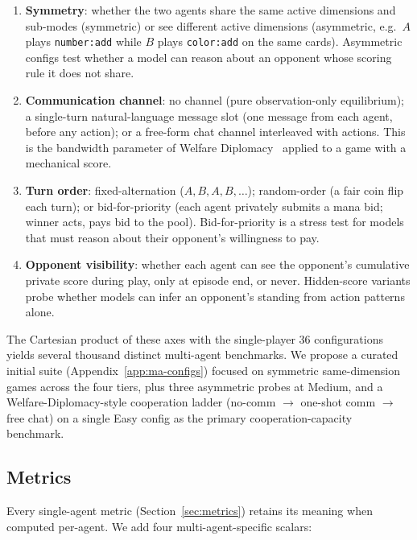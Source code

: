 \documentclass[11pt]{article}
\begin{document}
\begin{enumerate}
  \item \textbf{Symmetry}: whether the two agents share the same active
    dimensions and sub-modes (symmetric) or see different active
    dimensions (asymmetric, e.g.\ $A$ plays \texttt{number:add} while
    $B$ plays \texttt{color:add} on the same cards). Asymmetric configs
    test whether a model can reason about an opponent whose scoring
    rule it does not share.
  \item \textbf{Communication channel}: no channel (pure observation-only
    equilibrium); a single-turn natural-language message slot (one
    message from each agent, before any action); or a free-form
    chat channel interleaved with actions. This is the bandwidth
    parameter of Welfare Diplomacy~\citep{mukobi2024welfare} applied to
    a game with a mechanical score.
  \item \textbf{Turn order}: fixed-alternation ($A, B, A, B, \ldots$);
    random-order (a fair coin flip each turn); or bid-for-priority
    (each agent privately submits a mana bid; winner acts, pays bid to
    the pool). Bid-for-priority is a stress test for models that must
    reason about their opponent's willingness to pay.
  \item \textbf{Opponent visibility}: whether each agent can see the
    opponent's cumulative private score during play, only at episode
    end, or never. Hidden-score variants probe whether models can
    infer an opponent's standing from action patterns alone.
\end{enumerate}

The Cartesian product of these axes with the single-player 36
configurations yields several thousand distinct multi-agent benchmarks.
We propose a curated initial suite (Appendix~\ref{app:ma-configs})
focused on symmetric same-dimension games across the four tiers, plus
three asymmetric probes at Medium, and a Welfare-Diplomacy-style
cooperation ladder (no-comm $\to$ one-shot comm $\to$ free chat) on a
single Easy config as the primary cooperation-capacity benchmark.

\subsection{Metrics}
\label{sec:ma-metrics}

Every single-agent metric (Section~\ref{sec:metrics}) retains its meaning
when computed per-agent. We add four multi-agent-specific scalars:
\end{document}
